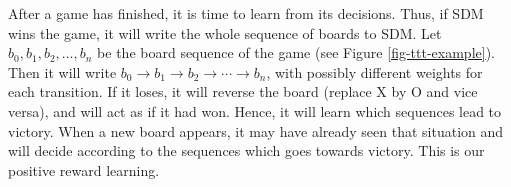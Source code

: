 After a game has finished, it is time to learn from its decisions. Thus, if SDM wins the game, it will write the whole sequence of boards to SDM. Let $b_0, b_1, b_2, \dots, b_n$ be the board sequence of the game (see Figure \ref{fig-ttt-example}). Then it will write $b_0 \rightarrow b_1 \rightarrow b_2 \rightarrow \cdots \rightarrow b_n$, with possibly different weights for each transition. If it loses, it will reverse the board (replace X by O and vice versa), and will act as if it had won. Hence, it will learn which sequences lead to victory. When a new board appears, it may have already seen that situation and will decide according to the sequences which goes towards victory. This is our positive reward learning.

\begin{figure}
    \captionsetup[subfigure]{labelformat=empty}


\end{figure}
